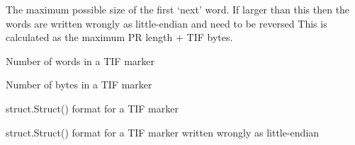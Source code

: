 \documentclass[letterpaper,10pt,english]{sphinxmanual}
\begin{document}

\begin{fulllineitems}
\label{\detokenize{ref/LIS/core/TifMarker:TotalDepth.LIS.core.TifMarker.TIF_FIRST_WORD_LIMIT}}
The maximum possible size of the first ‘next’ word. If larger than this then
the words are written wrongly as little-endian and need to be reversed
This is calculated as the maximum PR length + TIF bytes.

\end{fulllineitems}


\begin{fulllineitems}
\label{\detokenize{ref/LIS/core/TifMarker:TotalDepth.LIS.core.TifMarker.TIF_NUM_WORDS}}
Number of words in a TIF marker

\end{fulllineitems}


\begin{fulllineitems}
\label{\detokenize{ref/LIS/core/TifMarker:TotalDepth.LIS.core.TifMarker.TIF_TOTAL_BYTES}}
Number of bytes in a TIF marker

\end{fulllineitems}


\begin{fulllineitems}
\label{\detokenize{ref/LIS/core/TifMarker:TotalDepth.LIS.core.TifMarker.TIF_WORD_ALL_FORMAT}}
struct.Struct() format for a TIF marker

\end{fulllineitems}


\begin{fulllineitems}
\label{\detokenize{ref/LIS/core/TifMarker:TotalDepth.LIS.core.TifMarker.TIF_WORD_ALL_FORMAT_WRONG_SEX}}
struct.Struct() format for a TIF marker written wrongly as little-endian

\end{fulllineitems}
\end{document}
